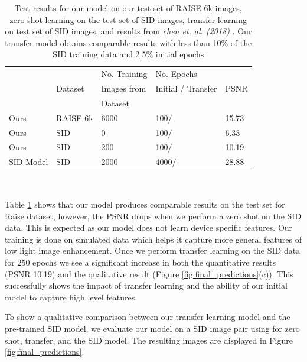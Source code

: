 \documentclass{article}
\begin{document}
\begin{table}[ht]
    \centering
    \begin{tabular}{lllll}
    \toprule
          \multirow{3}{*}{} &  &No. Training&No. Epochs& \\
                           Model &Dataset& Images from &Initial / Transfer& PSNR\\
                            &  &Dataset&  &\\
      
    \midrule
    Ours & RAISE 6k & 6000  & 100\space\space\space\space/\space\space-  & 15.73 \\
    Ours & SID & 0 & 100\space\space\space\space/\space\space0  & 6.33 \\
    Ours& SID & 200 & 100\space\space\space\space/\space\space250 &10.19 \\
    SID Model& SID& 2000 & 4000\space\space/\space\space\space- &28.88\\
    \bottomrule
  \end{tabular}
  \\[10pt]
    \caption{Test results for our model on our test set of RAISE 6k images, zero-shot learning on the test set of SID images, transfer learning on test set of SID images, and results from \textit{chen et. al. (2018)} \cite{chen2018learning}. Our transfer model obtains comparable results with less than 10\% of the SID training data and 2.5\% initial epochs}
    \label{table:results_table}
\end{table}
Table \ref{table:results_table} shows that our model produces comparable results on the test set for Raise dataset, however, the PSNR drops when we perform a zero shot on the SID data. This is expected as our model does not learn device specific features. Our training is done on simulated data which helps it capture more general features of low light image enhancement. Once we perform transfer learning on the SID data for 250 epochs we see a significant increase in both the quantitative results (PSNR 10.19) and the qualitative result (Figure \ref{fig:final_predictions}(c)). This successfully shows the impact of transfer learning and the ability of our initial model to capture high level features. 

To show a qualitative comparison between our transfer learning model and the pre-trained SID model, we evaluate our model on a SID image pair using for zero shot, transfer, and the SID model. The resulting images are displayed in Figure \ref{fig:final_predictions}. 
\end{document}
